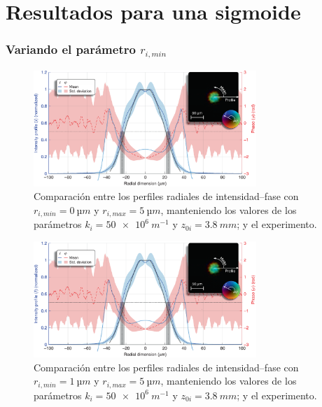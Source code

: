 \chapter{Resultados para una sigmoide}\label{anx:1}
\subsection*{Variando el parámetro $r_{i,min}$}

\begin{figure}[htbp]
  \centering
  \includegraphics[width=0.75\textwidth]{Figuras/anx_cmp_11.png}
  \caption*{Comparación entre los perfiles radiales de intensidad--fase con $r_{i,min}=\qty{0}{µm}$ y $r_{i,max}=\qty{5}{µm}$, manteniendo los valores de los parámetros $k_{i}=\qty{50e6}{m^{-1}}$ y $z_{0i}=\qty{3.8}{mm}$; y el experimento.}
\end{figure}

\begin{figure}[htbp]
  \centering
  \includegraphics[width=0.75\textwidth]{Figuras/anx_cmp_12.png}
  \caption*{Comparación entre los perfiles radiales de intensidad--fase con $r_{i,min}=\qty{1}{µm}$ y $r_{i,max}=\qty{5}{µm}$, manteniendo los valores de los parámetros $k_{i}=\qty{50e6}{m^{-1}}$ y $z_{0i}=\qty{3.8}{mm}$; y el experimento.}
\end{figure}

\newpage


